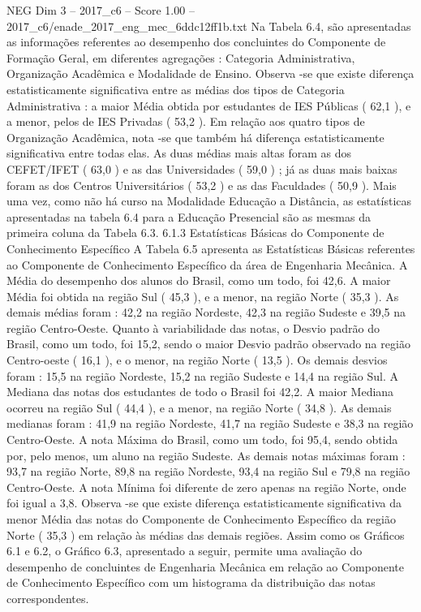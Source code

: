 \begin{textsample}{NEG Dim 3 – 2017\_c6 – Score 1.00 – 2017\_c6/enade\_2017\_eng\_mec\_6ddc12ff1b.txt}
Na Tabela 6.4, são apresentadas as informações referentes ao desempenho dos concluintes do Componente de Formação Geral, em diferentes agregações : Categoria Administrativa, Organização Acadêmica e Modalidade de Ensino.
Observa -se que existe diferença estatisticamente significativa entre as médias dos tipos de Categoria Administrativa : a maior Média obtida por estudantes de IES Públicas ( 62,1 ), e a menor, pelos de IES Privadas ( 53,2 ).
Em relação aos quatro tipos de Organização Acadêmica, nota -se que também há diferença estatisticamente significativa entre todas elas.
As duas médias mais altas foram as dos CEFET/IFET ( 63,0 ) e as das Universidades ( 59,0 ) ; já as duas mais baixas foram as dos Centros Universitários ( 53,2 ) e as das Faculdades ( 50,9 ).
Mais uma vez, como não há curso na Modalidade Educação a Distância, as estatísticas apresentadas na tabela 6.4 para a Educação Presencial são as mesmas da primeira coluna da Tabela 6.3. 6.1.3 Estatísticas Básicas do Componente de Conhecimento Específico A Tabela 6.5 apresenta as Estatísticas Básicas referentes ao Componente de Conhecimento Específico da área de Engenharia Mecânica.
A Média do desempenho dos alunos do Brasil, como um todo, foi 42,6.
A maior Média foi obtida na região Sul ( 45,3 ), e a menor, na região Norte ( 35,3 ).
As demais médias foram : 42,2 na região Nordeste, 42,3 na região Sudeste e 39,5 na região Centro-Oeste.
Quanto à variabilidade das notas, o Desvio padrão do Brasil, como um todo, foi 15,2, sendo o maior Desvio padrão observado na região Centro-oeste ( 16,1 ), e o menor, na região Norte ( 13,5 ).
Os demais desvios foram : 15,5 na região Nordeste, 15,2 na região Sudeste e 14,4 na região Sul.
A Mediana das notas dos estudantes de todo o Brasil foi 42,2.
A maior Mediana ocorreu na região Sul ( 44,4 ), e a menor, na região Norte ( 34,8 ).
As demais medianas foram : 41,9 na região Nordeste, 41,7 na região Sudeste e 38,3 na região Centro-Oeste.
A nota Máxima do Brasil, como um todo, foi 95,4, sendo obtida por, pelo menos, um aluno na região Sudeste.
As demais notas máximas foram : 93,7 na região Norte, 89,8 na região Nordeste, 93,4 na região Sul e 79,8 na região Centro-Oeste.
A nota Mínima foi diferente de zero apenas na região Norte, onde foi igual a 3,8.
Observa -se que existe diferença estatisticamente significativa da menor Média das notas do Componente de Conhecimento Específico da região Norte ( 35,3 ) em relação às médias das demais regiões.
Assim como os Gráficos 6.1 e 6.2, o Gráfico 6.3, apresentado a seguir, permite uma avaliação do desempenho de concluintes de Engenharia Mecânica em relação ao Componente de Conhecimento Específico com um histograma da distribuição das notas correspondentes.

\end{textsample}
